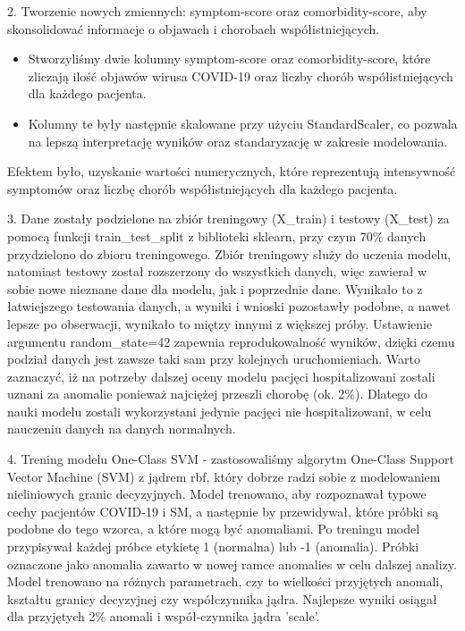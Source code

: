 \documentclass[a4paper,fleqn]{cas-dc}
\begin{document}
2. Tworzenie nowych zmiennych: symptom-score oraz comorbidity-score, aby skonsolidować informacje o objawach i chorobach współistniejących.
\begin{itemize} 
\item Stworzyliśmy dwie kolumny symptom-score oraz comorbidity-score, które zliczają ilość objawów wirusa COVID-19 oraz liczby chorób współistniejących dla każdego pacjenta.
\item  Kolumny te były następnie skalowane przy użyciu StandardScaler, co pozwala na lepszą interpretację wyników oraz standaryzację w zakresie modelowania.
\end{itemize}
Efektem było, uzyskanie wartości numerycznych, które reprezentują intensywność symptomów oraz liczbę chorób współistniejących dla każdego pacjenta.


3. Dane zostały podzielone na zbiór treningowy (X\_train) i testowy (X\_test) za pomocą funkcji train\_test\_split z biblioteki sklearn, przy czym 70\% danych przydzielono do zbioru treningowego. Zbiór treningowy służy do uczenia modelu, natomiast testowy został rozszerzony do wszystkich danych, więc zawierał w sobie nowe nieznane dane dla modelu, jak i poprzednie dane. Wynikało to z łatwiejszego testowania danych, a wyniki i wnioski pozostawły podobne, a nawet lepsze po obserwacji, wynikało to miętzy innymi z większej próby. Ustawienie argumentu random\_state=42 zapewnia reprodukowalność wyników, dzięki czemu podział danych jest zawsze taki sam przy kolejnych uruchomieniach. Warto zaznaczyć, iż na potrzeby dalszej oceny modelu pacjęci hospitalizowani zostali uznani za anomalie ponieważ najciężej przeszli chorobę (ok. 2\%). Dlatego do nauki modelu zostali wykorzystani jedynie pacjęci nie hospitalizowani, w celu nauczeniu danych na danych normalnych. 

4. Trening modelu One-Class SVM - zastosowaliśmy algorytm One-Class Support Vector Machine (SVM) z jądrem rbf, który dobrze radzi sobie z modelowaniem nieliniowych granic decyzyjnych. Model trenowano, aby rozpoznawał typowe cechy pacjentów COVID-19 i SM, a następnie by przewidywał, które próbki są podobne do tego wzorca, a które mogą być anomaliami. Po treningu model przypisywał każdej próbce etykietę 1 (normalna) lub -1 (anomalia). Próbki oznaczone jako anomalia zawarto w nowej ramce anomalies w celu dalszej analizy. Model trenowano na różnych parametrach, czy to wielkości przyjętych anomali, kształtu granicy decyzyjnej czy współczynnika jądra. Najlepsze wyniki osiągał dla przyjętych 2\% anomali i współ-czynnika jądra 'scale'.
\end{document}

